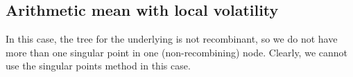\subsection{Arithmetic mean with local volatility}
\label{sec:am-local-vol}

In this case, the tree for the underlying is not recombinant, so we do not have more than one singular point in one (non-recombining) node. Clearly, we cannot use the singular points method in this case.

